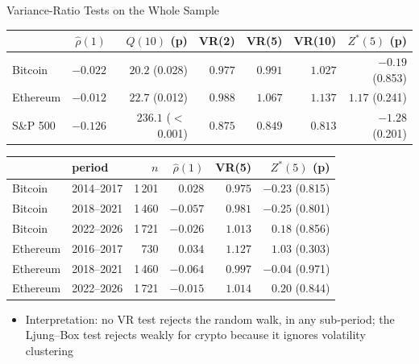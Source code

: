 \begin{frame}{Variance-Ratio Tests on the Whole Sample}
\itemsize{\footnotesize}
\begin{center}
\scriptsize
\begin{tabular}{lrrrrrr}
\toprule
& $\hat\rho(1)$ & $Q(10)$ (p) & VR(2) & VR(5) & VR(10) & $Z^*(5)$ (p) \\
\midrule
Bitcoin & $-0.022$ & $20.2$ (0.028) & $0.977$ & $0.991$ & $1.027$ & $-0.19$ (0.853) \\
Ethereum & $-0.012$ & $22.7$ (0.012) & $0.988$ & $1.067$ & $1.137$ & $1.17$ (0.241) \\
S\&P 500 & $-0.126$ & $236.1$ ($<$\,0.001) & $0.875$ & $0.849$ & $0.813$ & $-1.28$ (0.201) \\
\bottomrule
\end{tabular}
\end{center}
\begin{center}
\scriptsize
\begin{tabular}{llrrrr}
\toprule
& period & $n$ & $\hat\rho(1)$ & VR(5) & $Z^*(5)$ (p) \\
\midrule
Bitcoin & 2014--2017 & 1\,201 & $0.028$ & $0.975$ & $-0.23$ (0.815) \\
Bitcoin & 2018--2021 & 1\,460 & $-0.057$ & $0.981$ & $-0.25$ (0.801) \\
Bitcoin & 2022--2026 & 1\,721 & $-0.026$ & $1.013$ & $0.18$ (0.856) \\
Ethereum & 2016--2017 & 730 & $0.034$ & $1.127$ & $1.03$ (0.303) \\
Ethereum & 2018--2021 & 1\,460 & $-0.064$ & $0.997$ & $-0.04$ (0.971) \\
Ethereum & 2022--2026 & 1\,721 & $-0.015$ & $1.014$ & $0.20$ (0.844) \\
\bottomrule
\end{tabular}
\end{center}
\begin{itemize}
    \item Interpretation: no VR test rejects the random walk, in any sub-period; the Ljung--Box test rejects weakly for crypto because it ignores volatility clustering
\end{itemize}
\end{frame}

